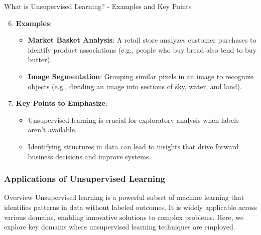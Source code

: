 \documentclass[aspectratio=169]{beamer}
\begin{document}
\begin{frame}[fragile]{What is Unsupervised Learning? - Examples and Key Points}
    \begin{enumerate}
        \setcounter{enumi}{5}
        \item \textbf{Examples}:
            \begin{itemize}
                \item \textbf{Market Basket Analysis}: A retail store analyzes customer purchases to identify product associations (e.g., people who buy bread also tend to buy butter).
                \item \textbf{Image Segmentation}: Grouping similar pixels in an image to recognize objects (e.g., dividing an image into sections of sky, water, and land).
            \end{itemize}

        \item \textbf{Key Points to Emphasize}:
            \begin{itemize}
                \item Unsupervised learning is crucial for exploratory analysis when labels aren't available.
                \item Identifying structures in data can lead to insights that drive forward business decisions and improve systems.
            \end{itemize}
    \end{enumerate}
\end{frame}

\begin{frame}[fragile]
    \frametitle{Applications of Unsupervised Learning}
    \begin{block}{Overview}
        Unsupervised learning is a powerful subset of machine learning that identifies patterns in data without labeled outcomes. 
        It is widely applicable across various domains, enabling innovative solutions to complex problems. 
        Here, we explore key domains where unsupervised learning techniques are employed.
    \end{block}
\end{frame}
\end{document}

